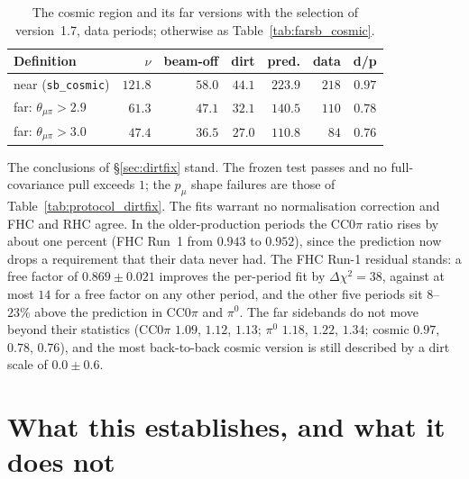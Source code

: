\documentclass[11pt,a4paper]{article}
\begin{document}
\begin{table}[H]
  \centering
  \caption{The cosmic region and its far versions with the selection of version~1.7, data periods; otherwise as
    Table~\ref{tab:farsb_cosmic}.}
  \label{tab:farsb_cosmic_braggfix}
  \small
  \begin{tabular}{lrrrrrc}
    \toprule
    Definition & $\nu$ & beam-off & dirt & pred. & data & d/p \\
    \midrule
    near (\texttt{sb\_cosmic})       & $121.8$ & $58.0$ & $44.1$ & $223.9$ & $218$ & $0.97$ \\
    far: $\theta_{\mu\pi}>2.9$       & $61.3$  & $47.1$ & $32.1$ & $140.5$ & $110$ & $0.78$ \\
    far: $\theta_{\mu\pi}>3.0$       & $47.4$  & $36.5$ & $27.0$ & $110.8$ & $84$  & $0.76$ \\
    \bottomrule
  \end{tabular}
\end{table}

The conclusions of \S\ref{sec:dirtfix} stand. The frozen test passes and no full-covariance pull exceeds $1$; the
$p_\mu$ shape failures are those of Table~\ref{tab:protocol_dirtfix}. The fits warrant no normalisation correction and
FHC and RHC agree. In the older-production periods the CC$0\pi$ ratio rises by about one percent (FHC Run~1 from
$0.943$ to $0.952$), since the prediction now drops a requirement that their data never had. The FHC Run-1 residual
stands: a free factor of $0.869\pm0.021$ improves the per-period fit by $\Delta\chi^2=38$, against at most $14$ for a
free factor on any other period, and the other five periods sit $8$--$23\%$ above the prediction in CC$0\pi$ and
$\pi^0$. The far sidebands do not move beyond their statistics (CC$0\pi$ $1.09$, $1.12$, $1.13$; $\pi^0$ $1.18$,
$1.22$, $1.34$; cosmic $0.97$, $0.78$, $0.76$), and the most back-to-back cosmic version is still described by a dirt
scale of $0.0\pm0.6$.

\section{What this establishes, and what it does not}
\label{sec:conclusions}
\end{document}
